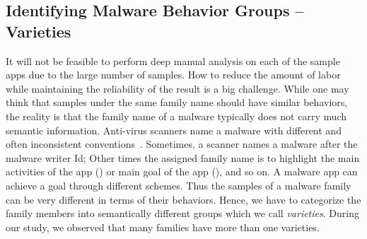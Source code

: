 


\subsection{Identifying Malware Behavior Groups -- Varieties}

It will not be feasible to perform deep manual analysis on each of the sample apps due to the large 
number of samples.
How to reduce the amount of labor while maintaining the reliability of the result is a big challenge.
While one may think that samples under the same family name should have similar behaviors, 
the reality is that the family name of a malware typically 
does not carry much semantic information. Anti-virus scanners name a malware
with different and often inconsistent conventions~\cite{hurier2016lack}. Sometimes, a scanner names a malware after
the malware writer Id; Other times the assigned family name is to highlight the main activities of the app (\eg {})
or main goal of the app (\eg {}), and so on. A malware app can achieve a goal through
different schemes. %
Thus the samples of a malware family can be very different in terms of their behaviors. 
Hence, we have to categorize the family members into semantically different groups which we call {\it varieties}. 
During our study, we observed that many families have more than one varieties.

